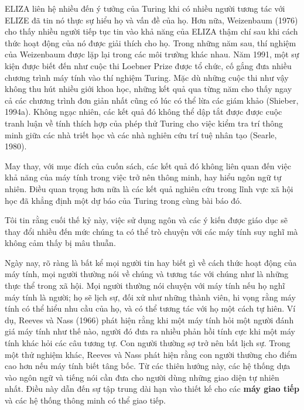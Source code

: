 ELIZA liên hệ nhiều đến ý tưởng của Turing khi có nhiều người tương tác với ELIZE đã tin nó thực sự hiểu họ và vấn đề của họ. Hơn nữa, Weizenbaum (1976) cho thấy nhiều người tiếp tục tin vào khả năng của ELIZA thậm chí sau khi cách thức hoạt động của nó được giải thích cho họ. Trong những năm sau, thí nghiệm của Weizenbaum được lặp lại trong các môi trường khác nhau. Năm 1991, một sự kiện được biết đến như cuộc thi Loebner Prize được tổ chức, cố gắng đưa nhiều chương trình máy tính vào thí nghiệm Turing. Mặc dù những cuộc thi như vậy không thu hút nhiều giới khoa học, những kết quả qua từng năm cho thấy ngay cả các chương trình đơn giản nhất cũng có lúc có thể lừa các giám khảo (Shieber, 1994a). Không ngạc nhiên, các kết quả đó không thể dập tắt được được cuộc tranh luận về tính thích hợp của phép thử Turing cho việc kiểm tra trí thông minh giữa các nhà triết học và các nhà nghiên cứu trí tuệ nhân tạo (Searle, 1980).

May thay, với mục đích của cuốn sách, các kết quả đó không liên quan đến việc khả năng của máy tính trong việc trở nên thông minh, hay hiểu ngôn ngữ tự nhiên. Điều quan trọng hơn nữa là các kết quả nghiên cứu trong lĩnh vực xã hội học đã khẳng định một dự báo của Turing trong cùng bài báo đó.

\begin{adjustwidth}{1.5cm}{}
Tôi tin rằng cuối thế kỷ này, việc sử dụng ngôn và các ý kiến được giáo dục sẽ thay đổi nhiều đến mức chúng ta có thể trò chuyện với các máy tính suy nghĩ mà không cảm thấy bị mâu thuẫn.
\end{adjustwidth}

Ngày nay, rõ ràng là bất kể mọi người tin hay biết gì về cách thức hoạt động của máy tính, mọi người thường nói về chúng và tương tác với chúng như là những thực thể trong xã hội. Mọi người thường nói chuyện với máy tính nếu họ nghĩ máy tính là người; họ sẽ lịch sự, đối xử như những thành viên, hi vọng rằng máy tính có thể hiểu nhu cầu của họ, và có thể tương tác với họ một cách tự hiên. Ví dụ, Reeves và Nass (1966) phát hiện rằng khi một máy tính hỏi một người đánh giá máy tính như thế nào, người đó đưa ra nhiều phản hồi tính cực khi một máy tính khác hỏi các câu tương tự. Con người thường sợ trở nên bất lịch sự. Trong một thử nghiệm khác, Reeves và Nass phát hiện rằng con người thường cho điểm cao hơn nếu máy tính biết tâng bốc. Từ các thiên hướng này, các hệ thống dựa vào ngôn ngữ và tiếng nói cần đưa cho người dùng những giao diện tự nhiên nhất. Điều này dẫn đến sự tập trung dài hạn vào thiết kế cho các \textbf{máy giao tiếp} và các hệ thống thông minh có thể giao tiếp.

